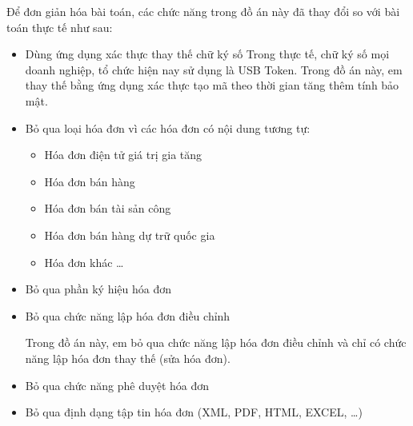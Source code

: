 Để đơn giản hóa bài toán, các chức năng trong đồ án này đã thay đổi so với bài toán thực tế như sau:

\begin{itemize}
    \item  Dùng   ứng dụng xác thực thay thế  chữ ký số
          Trong thực tế,   chữ ký số    mọi doanh nghiệp, tổ chức hiện nay  sử dụng là  USB Token.
          Trong đồ án này, em  thay thế bằng  ứng dụng xác thực   tạo mã theo thời gian tăng thêm tính bảo mật.
    \item Bỏ qua   loại hóa đơn vì các hóa đơn có nội dung   tương tự:

          \begin{itemize}

              \item Hóa đơn điện tử giá trị gia tăng

              \item Hóa đơn bán hàng

              \item Hóa đơn bán tài sản công

              \item Hóa đơn bán hàng dự trữ quốc gia

              \item Hóa đơn khác \dots

          \end{itemize}

    \item Bỏ qua phần ký hiệu hóa đơn


    \item Bỏ qua chức năng lập hóa đơn điều chỉnh

          Trong đồ án này, em bỏ qua chức năng lập hóa đơn điều chỉnh và chỉ có chức năng lập hóa đơn thay thế (sửa hóa đơn).

    \item Bỏ qua chức năng phê duyệt hóa đơn

    \item Bỏ qua định dạng tập tin hóa đơn (XML, PDF, HTML, EXCEL, \dots)

\end{itemize}